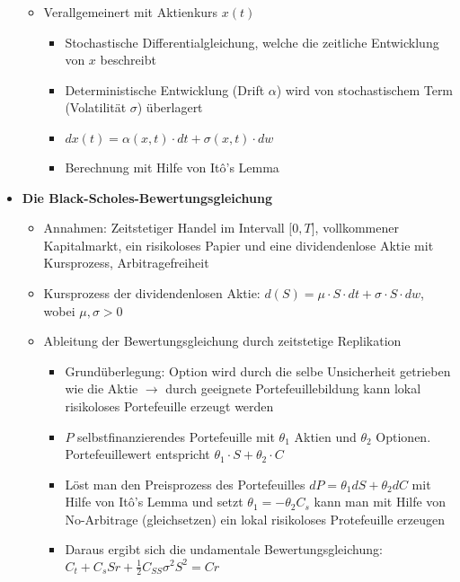 \begin{itemize}
\begin{itemize}
		\item Verallgemeinert mit Aktienkurs \(x(t)\)
		\begin{itemize}
			\item Stochastische Differentialgleichung, welche die zeitliche Entwicklung von \(x\) beschreibt
			\item Deterministische Entwicklung (Drift \(\alpha\)) wird von stochastischem Term (Volatilität \(\sigma\)) überlagert
			\item \(dx(t) = \alpha(x,t)\cdot dt + \sigma(x,t)\cdot dw\)
			\item Berechnung mit Hilfe von Itô's Lemma
		\end{itemize}
	\end{itemize}
	\item \textbf{Die Black-Scholes-Bewertungsgleichung}
	\begin{itemize}
		\item Annahmen: Zeitstetiger Handel im Intervall \(\lbrack 0,T\rbrack\), vollkommener Kapitalmarkt, ein risikoloses Papier und eine dividendenlose Aktie mit Kursprozess, Arbitragefreiheit
		\item Kursprozess der dividendenlosen Aktie: \(d(S) = \mu \cdot S \cdot dt + \sigma \cdot S \cdot dw\), wobei \(\mu,\sigma > 0\)
		\item Ableitung der Bewertungsgleichung durch zeitstetige Replikation
		\begin{itemize}
			\item Grundüberlegung: Option wird durch die selbe Unsicherheit getrieben wie die Aktie \(\rightarrow\) durch geeignete Portefeuillebildung kann lokal risikoloses Portefeuille erzeugt werden
			\item \(P\) selbstfinanzierendes Portefeuille mit \(\theta_1\) Aktien und \(\theta_2\) Optionen. Portefeuillewert entspricht \(\theta_1 \cdot S + \theta_2 \cdot C\)
			\item Löst man den Preisprozess des Portefeuilles \(dP = \theta_1dS + \theta_2dC\) mit Hilfe von Itô's Lemma und setzt \(\theta_1 = -\theta_2C_s\) kann man mit Hilfe von No-Arbitrage (gleichsetzen) ein lokal risikoloses Protefeuille erzeugen
			\item Daraus ergibt sich die undamentale Bewertungsgleichung: \(C_t + C_sSr + \frac{1}{2}C_{SS}\sigma^2S^2 = Cr\)
		\end{itemize}
	\end{itemize}
\end{itemize}



